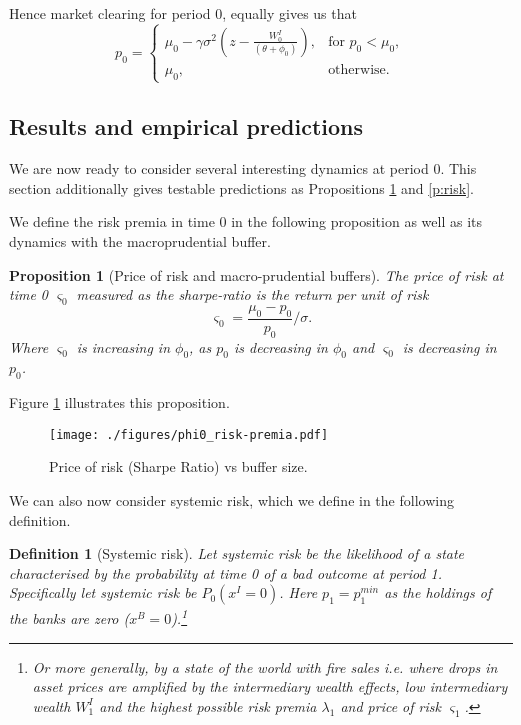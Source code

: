 \documentclass[11pt]{article}
\newtheorem{proposition}{Proposition}
\newtheorem{definition}{Definition}%
\begin{document}
Hence market clearing for period 0, equally gives us that
 \begin{equation}
 p_0 = \begin{cases}
\mu_0 - \gamma\sigma^2 \left(z-\frac{W^I_0}{(\theta + \phi_0)}\right), &\text{for } p_0 < \mu_0,\\
\mu_0, &\text{otherwise.}
\end{cases}
 \end{equation}

\subsection*{Results and empirical predictions}
We are now ready to consider several interesting dynamics at period 0. This section additionally gives testable predictions as Propositions \ref{p:price} and \ref{p:risk}.

We define the risk premia in time 0 in the following proposition as well as its dynamics with the macroprudential buffer.

\begin{proposition}[Price of risk and macro-prudential buffers]
\label{p:price}
The price of risk at time 0 $\varsigma_0$ measured as the sharpe-ratio is the return per unit of risk
\begin{equation}
\varsigma_0 = \frac{\mu_0 - p_0}{p_0}/\sigma.
\end{equation}
Where $\varsigma_0$ is increasing in $\phi_0$, as $p_0$ is decreasing in $\phi_0$ and $\varsigma_0$ is decreasing in $p_0$.
\end{proposition}

\noindent Figure \ref{f_probSRvsBuffer} illustrates this proposition.

\begin{figure}[h]
\centering
\texttt{[image: ./figures/phi0\_risk-premia.pdf]}
\caption{%
Price of risk (Sharpe Ratio) vs buffer size.\\%
}
\label{f_probSRvsBuffer}

\end{figure}


We can also now consider systemic risk, which we define in the following definition.

\begin{definition}[Systemic risk]
Let systemic risk be the likelihood of a state characterised by the probability at time 0 of a bad outcome at period 1. Specifically let systemic risk be $P_0 (x^I=0)$. Here $p_1 = p_1^{min}$ as the holdings of the banks are zero ($x^B = 0$).\footnote{Or more generally, by a state of the world with fire sales i.e. where drops in asset prices are amplified by the intermediary wealth effects, low intermediary wealth $W^I_1$ and the highest possible risk premia $\lambda_1$ and price of risk $\varsigma_1$.}
\end{definition}
\end{document}
